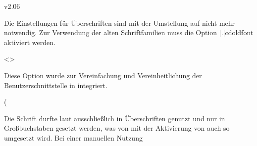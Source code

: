 \begin{NoIndexDefault}
\begin{Cessations}{v2.06}
\begin{Cessation}
\begin{Cessation}
Die Einstellungen für Überschriften sind mit der Umstellung auf \OpenSans nicht 
mehr notwendig. Zur Verwendung der alten Schriftfamilien muss die Option 
\Option|.|{cdoldfont} aktiviert werden.
\end{Cessation}
\end{Cessation}

\begin{Cessation}
  {}
  <>
\printdeclarationlist

Diese Option wurde zur Vereinfachung und Vereinheitlichung der 
Benutzerschnittstelle in  integriert.
\end{Cessation}

\begin{Cessation}
  {}
\begin{Cessation}
  {}
\begin{Cessation}
  {}
\begin{Cessation}
  {}
\begin{Cessation}
  {}
\begin{Cessation}
  {}
\begin{Cessation}
  {}
\begin{Cessation}
  {}
\begin{Cessation}
  {}
\begin{Cessation}
  {}
\begin{Cessation}
  {}
\begin{Cessation}
  {}
\begin{Cessation}
  {}
\begin{Cessation}
  {}
\begin{Cessation}
  {}
\begin{Cessation}
  {}
\begin{Cessation}
  {}
\begin{Cessation}
  {}
\printdeclarationlist(%
  \begin{quoting}
  \small%
  Die Schrift \DIN durfte laut \CD ausschließlich in Überschriften genutzt und 
  nur in Großbuchstaben gesetzt werden, was von \TUDScript mit der Aktivierung 
  von  auch so umgesetzt wird. Bei einer manuellen Nutzung 

\end{quoting}
\end{Cessation}
\end{Cessation}
\end{Cessation}
\end{Cessation}
\end{Cessation}
\end{Cessation}
\end{Cessation}
\end{Cessation}
\end{Cessation}
\end{Cessation}
\end{Cessation}
\end{Cessation}
\end{Cessation}
\end{Cessation}
\end{Cessation}
\end{Cessation}
\end{Cessation}
\end{Cessation}
\end{Cessations}
\end{NoIndexDefault}

